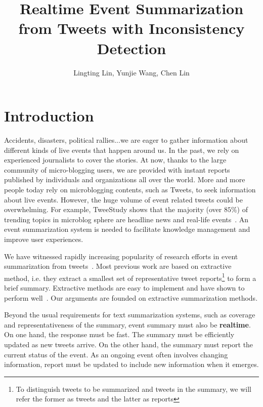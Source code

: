 \documentclass{llncs}
\begin{document}
\title{Realtime Event Summarization from Tweets with Inconsistency Detection}
\author{Lingting Lin, Yunjie Wang, Chen Lin}

\maketitle
\begin{abstract}
\end{abstract}
\section{Introduction}
Accidents, disasters, political rallies...we are eager to gather information about different kinds of live events that happen around us. In the past, we rely on experienced journalists to cover the stories. At now, thanks to the large community of micro-blogging users, we are provided with instant reports published by individuals and organizations all over the world.  More and more people today rely on microblogging contents, such as Tweets, to seek information about live events. However, the huge volume of event related tweets could be overwhelming. For example, TweeStudy shows that the majority (over $85\%$) of trending topics in microblog sphere are headline news and real-life events~\cite{kwak2010twitter}. An event summarization system is needed to facilitate knowledge management and improve user experiences.

We have witnessed rapidly increasing popularity of research efforts in event summarization from tweets~\cite{}.   Most previous work are based on extractive method, i.e. they extract a smallest set of representative tweet reports\footnote{To distinguish tweets to be summarized and tweets in the summary, we will refer the former as tweets and the latter as reports} to form a brief summary. Extractive methods are easy to implement and have shown to perform well~\cite{}. Our arguments are founded on extractive summarization methods.

Beyond the usual requirements for text summarization systems, such as coverage and representativeness of the summary,  event summary must also be \textbf{realtime}. On one hand, the response must be fast. The summary must be efficiently updated as new tweets arrive. On the other hand, the summary must report the current status of the event. As an ongoing event often involves changing information, report must be updated to include new information when it emerges.
\end{document}
